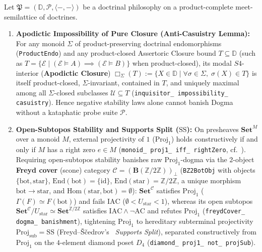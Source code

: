\begin{proposition}\label{prop:anti-casuistry-schism}%
%
%
Let $\mathfrak{P} = (\mathbb{D}, \mathcal{P}, \langle -, - \rangle)$ be a doctrinal philosophy on a product-complete meet-semilattice of doctrines.
\begin{enumerate}
  \item \textbf{Apodictic Impossibility of Pure Closure (Anti-Casuistry Lemma):} For any monoid $\Sigma$ of product-preserving doctrinal endomorphisms (\texttt{ProductEndo}) and any product-closed Assertoric Closure bound $T \subseteq \mathbb{D}$ (such as $T = \{\mathcal{E} \mid (\mathcal{E} \models A) \implies (\mathcal{E} \models B)\}$ when product-closed), its modal $S4$-interior (\textbf{Apodictic Closure}) $\Box_\Sigma(T) := \{X \in \mathbb{D} \mid \forall \sigma \in \Sigma,\; \sigma(X) \in T\}$ is itself product-closed, $\Sigma$-invariant, contained in $T$, and uniquely maximal among all $\Sigma$-closed subclasses $\mathcal{U} \subseteq T$ (\texttt{inquisitor\_ impossibility\_ casuistry}). Hence negative stability laws alone cannot banish Dogma without a kataphatic probe suite $\mathcal{P}$.
  \item \textbf{Open-Subtopos Stability and Supports Split ($\mathrm{SS}$):} On presheaves $\mathbf{Set}^M$ over a monoid $M$, external projectivity of $1$ ($\mathrm{Proj}_1$) holds constructively if and only if $M$ has a right zero $e \in M$ (\texttt{monoid\_ proj1\_ iff\_ rightZero}, cf.~\cite{HemelaerRogers21}). Requiring open-subtopos stability banishes raw $\mathrm{Proj}_1$-dogma via the $2$-object \textbf{Freyd cover} (scone) category $\mathcal{C} = (\mathbf{B}(\mathbb{Z}/2\mathbb{Z}))_\bot$ (\texttt{BZ2BotObj} with objects $\{\mathrm{bot}, \mathrm{star}\}$, $\mathrm{End}(\mathrm{bot}) = \{\mathrm{id}\}$, $\mathrm{End}(\mathrm{star}) = \mathbb{Z}/2\mathbb{Z}$, a unique morphism $\mathrm{bot} \to \mathrm{star}$, and $\mathrm{Hom}(\mathrm{star}, \mathrm{bot}) = \emptyset$): $\mathbf{Set}^{\mathcal{C}}$ satisfies $\mathrm{Proj}_1$ ($\Gamma(F) \simeq F(\mathrm{bot})$) and fails $\mathrm{IAC}$ ($\emptyset < U_{\mathrm{star}} < 1$), whereas its open subtopos $\mathbf{Set}^{\mathcal{C}}/U_{\mathrm{star}} \simeq \mathbf{Set}^{\mathbb{Z}/2\mathbb{Z}}$ satisfies $\mathrm{IAC} \wedge \neg\mathrm{AC}$ and refutes $\mathrm{Proj}_1$ (\texttt{freydCover\_ dogma\_ banishment}), tightening $\mathrm{Proj}_1$ to hereditary subterminal projectivity $\mathrm{Proj}_{\mathrm{sub}} = \mathrm{SS}$ (Freyd--{\v{S}}{\v{c}}edrov's~\cite{FreydScedrov90} \emph{Supports Split}), separated constructively from $\mathrm{Proj}_1$ on the $4$-element diamond poset $D_4$ (\texttt{diamond\_ proj1\_ not\_ projSub}).

\end{enumerate}
\end{proposition}
